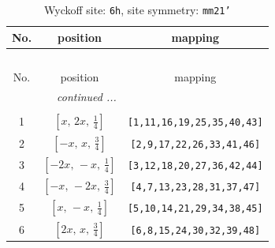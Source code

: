 \documentclass[fleqn,8pt]{jsarticle}
\begin{document}
\begin{longtable}{ccc}
\caption{Wyckoff site: {\tt 6h}, site symmetry: {\tt mm21'}}
 \\
 \hline \hline
No. & position & mapping \\ \hline \endfirsthead

\multicolumn{2}{l}{\tablename\ \thetable{}} \\
 \hline \hline
No. & position & mapping \\ \hline \endhead

 \hline \hline
\multicolumn{2}{r}{\footnotesize\it continued ...} \\ \endfoot

 \hline \hline
\multicolumn{2}{r}{} \\ \endlastfoot

1 & $\left[ x,\, 2 x,\, \frac{1}{4} \right]$ & {\tt [1,11,16,19,25,35,40,43]} \\ \hline
2 & $\left[ - x,\, x,\, \frac{3}{4} \right]$ & {\tt [2,9,17,22,26,33,41,46]} \\ \hline
3 & $\left[ - 2 x,\, - x,\, \frac{1}{4} \right]$ & {\tt [3,12,18,20,27,36,42,44]} \\ \hline
4 & $\left[ - x,\, - 2 x,\, \frac{3}{4} \right]$ & {\tt [4,7,13,23,28,31,37,47]} \\ \hline
5 & $\left[ x,\, - x,\, \frac{1}{4} \right]$ & {\tt [5,10,14,21,29,34,38,45]} \\ \hline
6 & $\left[ 2 x,\, x,\, \frac{3}{4} \right]$ & {\tt [6,8,15,24,30,32,39,48]} \\
\end{longtable}
\renewcommand{\arraystretch}{1.2}
\end{document}
